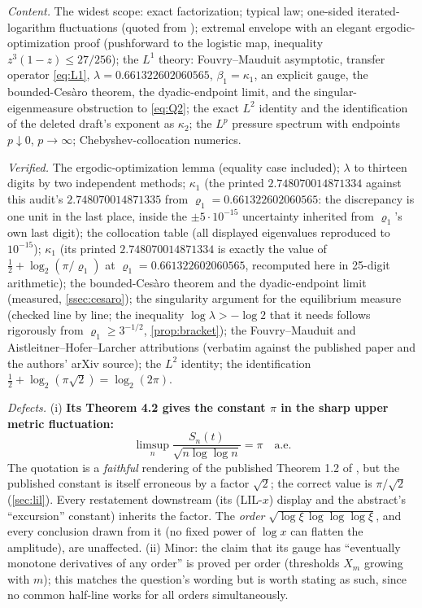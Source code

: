 \documentclass[11pt,oneside]{article}
\theoremstyle{definition}
\theoremstyle{remark}
\begin{document}
\emph{Content.}  The widest scope: exact factorization; typical law;
one-sided iterated-logarithm fluctuations (quoted from \cite{ahl2017});
extremal envelope with an elegant ergodic-optimization proof (pushforward
to the logistic map, inequality $z^3(1-z)\le27/256$); the $L^1$ theory:
Fouvry--Mauduit asymptotic, transfer operator \eqref{eq:L1},
$\lambda=0.661322602060565$, $\beta_1=\kappa_1$, an explicit gauge, the
bounded-Ces\`aro theorem, the dyadic-endpoint limit, and the
singular-eigenmeasure obstruction to \eqref{eq:Q2}; the exact $L^2$
identity and the identification of the deleted draft's exponent as
$\kappa_2$; the $L^p$ pressure spectrum with endpoints
$p\downarrow0$, $p\to\infty$; Chebyshev-collocation numerics.

\emph{Verified.}  The ergodic-optimization lemma (equality case included);
$\lambda$ to thirteen digits by two independent methods; $\kappa_1$
(the printed $2.748070014871334$ against this audit's
$2.748070014871335$ from $\varrho_1=0.661322602060565$: the discrepancy
is one unit in the last place, inside the $\pm5\cdot10^{-15}$ uncertainty
inherited from $\varrho_1$'s own last digit);
the collocation table (all displayed eigenvalues reproduced to
$10^{-15}$); $\kappa_1$ (its printed $2.748070014871334$ is exactly the
value of $\tfrac12+\log_2(\pi/\varrho_1)$ at
$\varrho_1=0.661322602060565$, recomputed here in 25-digit arithmetic);
the bounded-Ces\`aro theorem and the dyadic-endpoint limit
(measured, \cref{ssec:cesaro}); the singularity argument for the
equilibrium measure (checked line by line; the inequality
$\log\lambda>-\log2$ that it needs follows rigorously from
$\varrho_1\ge3^{-1/2}$, \cref{prop:bracket}); the Fouvry--Mauduit and
Aistleitner--Hofer--Larcher attributions (verbatim against the published
paper and the authors' arXiv source); the $L^2$ identity; the
identification $\tfrac12+\log_2(\pi\sqrt2)=\log_2(2\pi)$.

\emph{Defects.}
(i) \textbf{Its Theorem 4.2 gives the constant $\pi$ in the sharp upper
metric fluctuation:}
\[
 \limsup_n\frac{S_n(t)}{\sqrt{n\log\log n}}=\pi
 \quad\text{a.e.}
\]
The quotation is a
\emph{faithful} rendering of the published Theorem 1.2 of \cite{ahl2017},
but the published constant is itself erroneous by a factor $\sqrt2$; the
correct value is $\pi/\sqrt2$ (\cref{sec:lil}).  Every restatement
downstream (its (LIL-$x$) display and the abstract's
``excursion'' constant) inherits the factor.  The \emph{order}
$\sqrt{\log\xi\,\log\log\log\xi}$, and every conclusion drawn from it
(no fixed power of $\log x$ can flatten the amplitude), are unaffected.
(ii) Minor: the claim that its gauge has ``eventually monotone
derivatives of any order'' is proved per order (thresholds $X_m$ growing
with $m$); this matches the question's wording but is worth stating as
such, since no common half-line works for all orders simultaneously.
\end{document}
